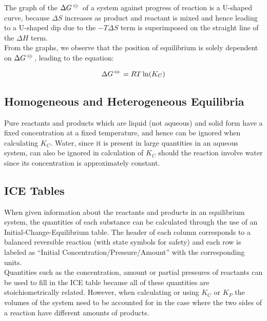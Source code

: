 \documentclass[../main]{subfiles}
\begin{document}
	The graph of the \(\Delta G^{-\kern-4pt{\ominus}\kern-4pt-}\) of a system against progress of reaction is a U-shaped curve, because \(\Delta S\) increases as product and reactant is mixed and hence leading to a U-shaped dip due to the \(- T \Delta S\) term is superimposed on the straight line of the \(\Delta H\) term. \\

	From the graphs, we observe that the position of equilibrium is solely dependent on \(\Delta G^{-\kern-4pt{\ominus}\kern-4pt-}\), leading to the equation: 

	\[ \Delta G^{-\kern-4pt{\ominus}\kern-4pt-} = R T \ln(K_C) \]

	\subsection{Homogeneous and Heterogeneous Equilibria}



	Pure reactants and products which are liquid (not aqueous) and solid form have a fixed concentration at a fixed temperature, and hence can be ignored when calculating \(K_C\). Water, since it is present in large quantities in an aqueous system, can also be ignored in calculation of \(K_C\) should the reaction involve water since its concentration is approximately constant.

	\subsection{ICE Tables}

	When given information about the reactants and products in an equilibrium system, the quantities of each substance can be calculated through the use of an Initial-Change-Equilibrium table. The header of each column corresponds to a balanced reversible reaction (with state symbols for safety) and each row is labeled as ``Initial Concentration/Pressure/Amount'' with the corresponding units.\\

	Quantities such as the  concentration, amount or partial pressures of reactants can be used to fill in the ICE table because all of these quantities are stoichiometrically related. However, when calculating or using \(K_C\) or \(K_P\) the volumes of the system need to be accounted for in the case where the two sides of a reaction have different amounts of products. \\
\end{document}

